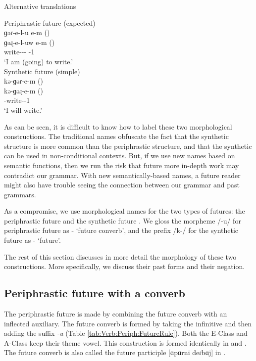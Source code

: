 \begin{exe}
	\ex Alternative translations \label{ex:Verb:Fut:avetyanNames}\begin{xlist}
		
		\ex Periphrastic future (expected) \\
		\glll ɡəɾ-e-l-u e-m ({\seaAbbre}) \\
		ɡəɻ-e-l-uw e-m ({\iaAbbre}) \\
		write-{\thgloss}-{\infgloss}-{\futcvb} {\auxgloss}-1{\sg} \\
		\trans `I am (going) to write.'\\
		\ex Synthetic future (simple) \\
		\glll kə-ɡəɾ-e-m ({\seaAbbre}) \\
		kə-ɡəɻ-e-m ({\iaAbbre}) \\
		{\fut}-write-{\thgloss}-1{\sg} \\
		\trans `I will write.' \\
	\end{xlist}
\end{exe}

As can be seen, it is difficult to know how to label these two morphological constructions. The traditional names obfuscate the fact that the synthetic structure is more common than the periphrastic structure, and that the synthetic can be used in non-conditional contexts. But, if we use  new names based on semantic functions, then we run the risk that future more in-depth work may contradict our grammar. With new semantically-based names, a future reader might also have trouble seeing the connection between our grammar and past grammars. 

As a compromise, we use morphological names for the two types of futures: the periphrastic future and the synthetic future \citep{fairbanksStevick-1975-spokenEastArmenian}. We gloss the morpheme /-u/ for periphrastic future as -{\futcvb} `future converb', and the prefix /k-/ for the synthetic future as {\fut}- `future'. 

The rest of this section discusses  in more detail   the morphology of these two constructions. More specifically, we discuss their   past forms  and their negation. 

\subsection{Periphrastic future with a converb}
\label{section:verb:fut:peri}
The periphrastic future is made by combining the future converb with an inflected auxiliary. The future converb is formed by taking the infinitive  and then adding the suffix \textit{{-u}} (Table \ref{tab:Verb:Periph:FutureRule}). Both the E-Class and A-Class keep their theme vowel. This construction is formed identically in {\seaSE} and {\iaIA}. The future converb is also called the future participle   [ɑpɑrni deɾbɑj]   in {\seaSEA} \citep[206]{DumTragut-2009-ArmenianReferenceGrammar}.


